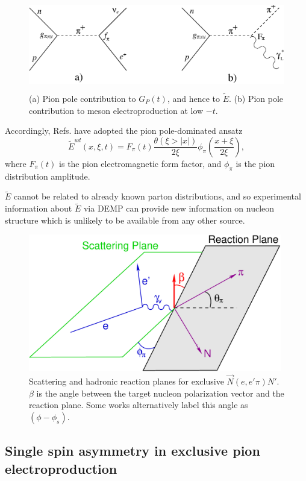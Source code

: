 \documentclass[preprint,superscriptaddress]{revtex4}
\begin{document}
\begin{figure}[hbtp!]
\includegraphics[height=4cm]{PCAC_pion_pole.eps}
\caption{\label{fig:PCAC_pion_pole}
(a) Pion pole contribution to $G_P(t)$, and hence to $\tilde{E}$.
(b) Pion pole contribution to meson electroproduction at low $-t$.
}
\end{figure}

Accordingly, Refs. \cite{Pe00,Be01} have adopted the pion pole-dominated
ansatz
\begin{equation}
\tilde{E}^{ud}(x,\xi,t) = F_{\pi}(t)\frac{\theta (\xi>|x|)}{2\xi
}\phi_{\pi}(\frac{x+\xi}{2\xi}),
\end{equation}
where $F_{\pi}(t)$ is the pion electromagnetic form factor, and $\phi_{\pi}$ is
the pion distribution amplitude.

$\tilde{E}$ cannot be related to already known parton distributions,
and so experimental information about $\tilde{E}$ via DEMP 
can provide new information on nucleon structure which is
unlikely to be available from any other source.

\begin{figure}[hbt!]
\includegraphics[height=6cm]{atpi_planes.eps}
\caption{\label{fig:planes}
Scattering and hadronic reaction planes for exclusive $\vec{N}(e,e'\pi)N'$.
$\beta$ is the angle between the target nucleon polarization vector and the
reaction plane.  Some works alternatively label this angle as $(\phi-\phi_s)$.
}
\end{figure}

\subsection{Single spin asymmetry in exclusive pion electroproduction}
\end{document}

